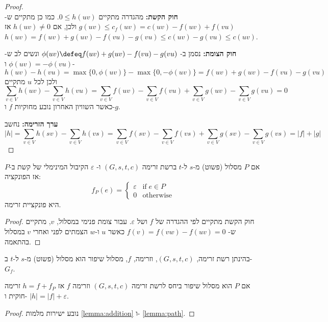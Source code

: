 \begin{proof}
$ $\\
\textbf{חוק הקשת:}
מהגדרה מתקיים 
$0 \leq h(uv)$.
כמו כן מתקיים ש-%
$g(uv) \leq c_f(uv) = c(uv) - f(uv) + f(vu)$
ולכן, אם
$h(uv) \neq 0$
אז
$h(uv) = f(uv) + g(uv) - f(vu) - g(vu) \leq c(uv) - g(vu) \leq c(uv)$.

\textbf{חוק הצומת:}
נסמן ב-%
$\phi(uv) \defeq f(uv) + g(uv) - f(vu) - g(vu)$
ונשים לב ש-%
$\phi(uv) = -\phi(vu)$
ו-%
$$
h(uv) - h(vu) = 
\max\{0, \phi(uv)\} - 
\max\{0, -\phi(uv)\} = 
f(uv) + g(uv) - f(vu) - g(vu)
$$
ולכן לכל $u$ מתקיים
$$
\sum_{v \in V}h(uv) - \sum_{v \in V}h(vu) = 
\sum_{v \in V}f(uv) - \sum_{v \in V}f(vu) + 
\sum_{v \in V}g(uv) - \sum_{v \in V}g(vu) = 0
$$
כאשר השוויון האחרון נובע מחוקיות $f$ ו-$g$.

\textbf{ערך הזרימה:}
נחשב
$$
|h| = 
\sum_{v \in V}h(sv) - \sum_{v \in V}h(vs) = 
\sum_{v \in V}f(sv) - \sum_{v \in V}f(vs) + 
\sum_{v \in V}g(sv) - \sum_{v \in V}g(vs) = |f| + |g|
$$
\end{proof}

\begin{lemma}
\label{lemma:path}
אם $P$ מסלול (פשוט) מ-$s$ ל-$t$ ברשת זרימה 
$(G, s, t, c)$
ו-%
$\varepsilon$
הקיבול המינימלי של קשת ב-$P$ אז הפונקציה:
$$
f_P(e) = 
\begin{cases}
\varepsilon & \text{if} \; e \in P
\\
0 & \text{otherwise}
\end{cases}
$$
היא פונקציית זרימה.
\end{lemma}

\begin{proof}
חוק הקשת מתקיים לפי ההגדרה של $f$ ושל 
$\varepsilon$.
עבור צומת פנימי במסלול, $v$, מתקיים ש-%
$f(v) = f(vw) - f(uv) = 0$
כאשר $u$ ו-$w$ הצמתים לפני ואחרי $v$ במסלול בהתאמה.
\end{proof}

\begin{definition}
בהינתן רשת זרימה,
$(G, s, t, c)$,
וזרימה, $f$, 
מסלול שיפור הוא מסלול (פשוט) מ-$s$ ל-$t$ ב-%
$G_f$.
\end{definition}

\begin{lemma}
\label{lemma:improve}
אם $P$ הוא מסלול שיפור ביחס לרשת זרימה 
$(G, s, t, c)$
וזרימה
$f$
אז
$h = f + f_P$
זרימה חוקית ו-%
${|h| = |f| + \varepsilon}$.
\end{lemma}

\begin{proof}
נובע ישירות מלמות
\ref{lemma:addition}
ו-%
\ref{lemma:path}.
\end{proof}
